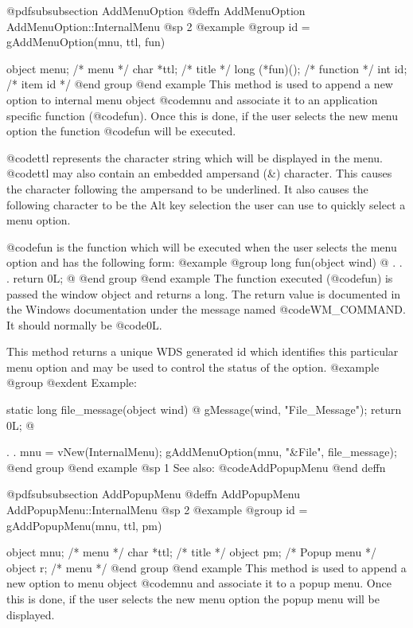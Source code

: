@pdfsubsubsection {AddMenuOption}
@deffn {AddMenuOption} AddMenuOption::InternalMenu
@sp 2
@example
@group
id = gAddMenuOption(mnu, ttl, fun)

object  menu;   /*  menu     */
char    *ttl;   /*  title    */
long    (*fun)(); /*  function  */
int     id;     /*  item id  */
@end group
@end example
This method is used to append a new option to internal menu object
@code{mnu} and associate it to an application specific function
(@code{fun}).  Once this is done, if the user selects the new menu
option the function @code{fun} will be executed.

@code{ttl} represents the character string which will be displayed
in the menu.  @code{ttl} may also contain an embedded ampersand (&)
character.  This causes the character following the ampersand to
be underlined.  It also causes the following character to be the
Alt key selection the user can use to quickly select a menu option.

@code{fun} is the function which will be executed when the user selects
the menu option and has the following form:
@example
@group
long    fun(object wind)
@{
        .
        .
        .
        return 0L;
@}
@end group
@end example
The function executed (@code{fun}) is passed the window object and
returns a long.  The return value is documented in the Windows documentation
under the message named @code{WM_COMMAND}.  It should normally be @code{0L}.

This method returns a unique WDS generated id which identifies this
particular menu option and may be used to control the status of the option.
@example
@group
@exdent Example:

static  long    file_message(object wind)
@{
        gMessage(wind, "File_Message");
        return 0L;
@}

        .
        .
        mnu = vNew(InternalMenu);
        gAddMenuOption(mnu, "&File", file_message);
@end group
@end example
@sp 1
See also:  @code{AddPopupMenu}
@end deffn











@pdfsubsubsection {AddPopupMenu}
@deffn {AddPopupMenu} AddPopupMenu::InternalMenu
@sp 2
@example
@group
id = gAddPopupMenu(mnu, ttl, pm)

object  mnu;    /*  menu        */
char    *ttl;   /*  title       */
object  pm;     /*  Popup menu  */
object  r;      /*  menu        */
@end group
@end example
This method is used to append a new option to menu object @code{mnu} and
associate it to a popup menu.  Once this is done, if the user selects
the new menu option the popup menu will be displayed.

